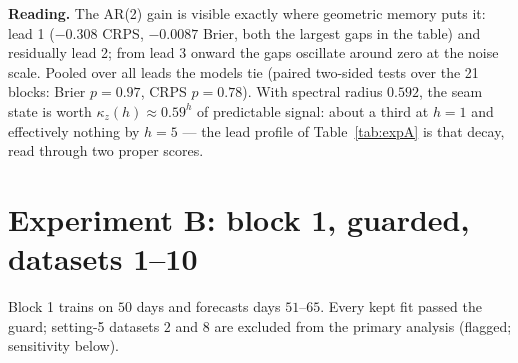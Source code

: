 \documentclass[11pt]{article}
\begin{document}
\textbf{Reading.} The AR(2) gain is visible exactly where geometric memory
puts it: lead 1 ($-0.308$ CRPS, $-0.0087$ Brier, both the largest gaps in
the table) and residually lead 2; from lead 3 onward the gaps oscillate
around zero at the noise scale. Pooled over all leads the models tie
(paired two-sided tests over the 21 blocks: Brier $p = 0.97$, CRPS
$p = 0.78$). With spectral radius $0.592$, the seam state is worth
$\kappa_z(h) \approx 0.59^h$ of predictable signal: about a third at
$h = 1$ and effectively nothing by $h = 5$ --- the lead profile of
Table~\ref{tab:expA} is that decay, read through two proper scores.

\section{Experiment B: block 1, guarded, datasets 1--10}

Block 1 trains on $50$ days and forecasts days $51$--$65$. Every kept fit
passed the guard; setting-5 datasets $2$ and $8$ are excluded from the
primary analysis (flagged; sensitivity below).
\end{document}

